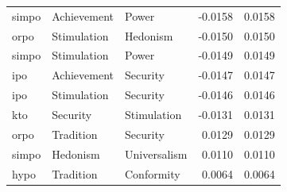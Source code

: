 \begin{tabular}{lllrr}
simpo & Achievement & Power & -0.0158 & 0.0158 \\
orpo & Stimulation & Hedonism & -0.0150 & 0.0150 \\
simpo & Stimulation & Power & -0.0149 & 0.0149 \\
ipo & Achievement & Security & -0.0147 & 0.0147 \\
ipo & Stimulation & Security & -0.0146 & 0.0146 \\
kto & Security & Stimulation & -0.0131 & 0.0131 \\
orpo & Tradition & Security & 0.0129 & 0.0129 \\
simpo & Hedonism & Universalism & 0.0110 & 0.0110 \\
hypo & Tradition & Conformity & 0.0064 & 0.0064 \\
\bottomrule
\end{tabular}
